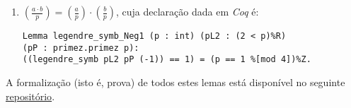 \begin{enumerate}
        \item $\left(\frac{a \cdot b}{p}\right) = \left(\frac{a}{p}\right) \cdot \left(\frac{b}{p}\right)$, cuja declaração dada em \textit{Coq} é:
        \begin{tcolorbox}[colback=yellow!5!white,colframe=yellow!75!black,width=14cm]
        \begin{lstlisting}[language=coq]
Lemma legendre_symb_Neg1 (p : int) (pL2 : (2 < p)%R) 
(pP : primez.primez p):
((legendre_symb pL2 pP (-1)) == 1) = (p == 1 %[mod 4])%Z.
        \end{lstlisting}
        \end{tcolorbox}
\end{enumerate}

A formalização (isto é, prova) de todos estes lemas está disponível no seguinte \hyperlink{https://github.com/bruniculos08/TCC2005/blob/main/Código - Parte 02/InversoMultiplicativo.v}{repositório}.

